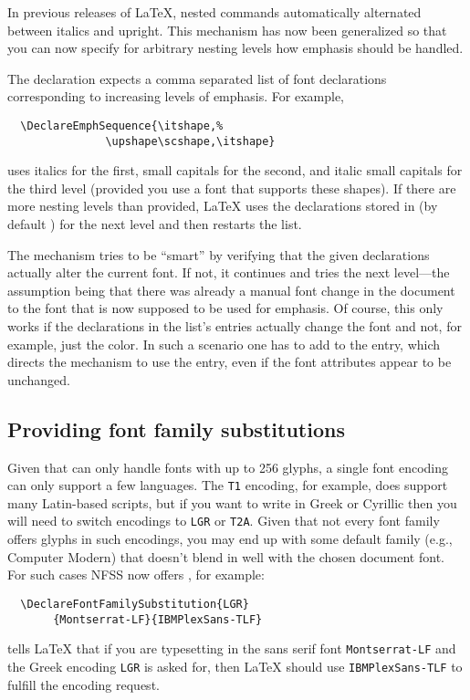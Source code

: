 \documentclass{ltnews}
\providecommand\pdfTeX{\hologo{pdfTeX}}
\begin{document}
In previous releases of \LaTeX{}, nested  commands
automatically alternated between italics and upright.  This mechanism
has now been generalized so that you can now specify for arbitrary nesting
levels how emphasis should be handled.

The declaration  expects a comma separated
list of font declarations corresponding to increasing levels of
emphasis. For example,
\begin{verbatim}
  \DeclareEmphSequence{\itshape,%
               \upshape\scshape,\itshape}
\end{verbatim}
uses italics for the first, small capitals for the second, and italic
small capitals for the third level (provided you use a font that
supports these shapes).  If there are more nesting levels than
provided, \LaTeX{} uses the declarations stored in  (by
default ) for the next level and then
restarts the list.

The mechanism tries to be \enquote{smart} by verifying that the given
declarations actually alter the current font. If not, it continues and
tries the next level---the assumption being that there was already a
manual font change in the document to the font that is now supposed to
be used for emphasis.
%
Of course, this only works if the declarations in the list's entries
actually change the font and not, for example, just the color. In such
a scenario one has to add  to the entry, which directs the
mechanism to use the entry, even if the font attributes appear to be
unchanged.


\subsection{Providing font family substitutions}

Given that \pdfTeX{} can only handle fonts with up to 256 glyphs, a
single font encoding can only support a few languages. The \texttt{T1}
encoding, for example, does support many Latin-based scripts,
but if you want to write in Greek or Cyrillic then you will need to switch
encodings to \texttt{LGR} or \texttt{T2A}. Given that not every font
family offers glyphs in such encodings, you may end up with some
default family (e.g., Computer Modern) that doesn’t blend in well
with the chosen document font.  For such cases NFSS now offers
, for example:
\begin{verbatim}
  \DeclareFontFamilySubstitution{LGR}
       {Montserrat-LF}{IBMPlexSans-TLF}
\end{verbatim}
tells \LaTeX{} that if you are typesetting in the sans serif font
\texttt{Montserrat-LF} and the Greek encoding \texttt{LGR} is asked
for, then \LaTeX{} should use \texttt{IBMPlexSans-TLF} to fulfill
the encoding request.
\end{document}
